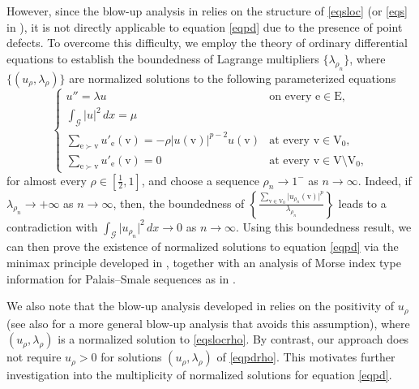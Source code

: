\documentclass[11pt]{amsart}
\newcommand{\abs}[1]{\lvert#1\rvert}
\newcommand{\G}{\mathcal{G}}
\newcommand{\E}{\mathrm{E}}
\newcommand{\V}{\mathrm{V}}
\newcommand{\e}{\mathrm{e}}
\newcommand{\vv}{\mathrm{v}}
\numberwithin{equation}{section}
\begin{document}
However, since the blow-up analysis in \cite{Bort}  relies on the structure of \eqref{eqsloc} (or \eqref{eqs} in \cite{Cha}), it is not directly applicable to equation \eqref{eqpd} due to the presence of point defects. To overcome this difficulty, we employ the theory of ordinary differential equations to establish the boundedness of Lagrange multipliers $\{\lambda_{\rho_n}\}$, where $\{(u_{\rho},\lambda_{\rho})\}$ are normalized solutions to the following parameterized equations
\begin{equation}\label{eqpdrho}
       \begin{cases} 
u'' = \lambda u & \text{on every }\e \in \E, \\ 
\int_\G\abs{u}^2\, dx = \mu & \\
\displaystyle\sum_{\e \succ \vv} u'_\e(\vv) = -\rho|u(\vv)|^{p-2}u(\vv) & \text{at every } \vv \in \V_0,\\
\displaystyle\sum_{\e \succ \vv} u'_\e(\vv) = 0 & \text{at every } \vv \in \V \setminus \V_0,
\end{cases} 
\end{equation}
for almost every $\rho \in [\frac{1}{2},1]$, and choose a sequence $\rho_n\to1^-$ as $n \to \infty$. Indeed, if $\lambda_{\rho_n} \to +\infty$ as $n \to \infty$, then, the boundedness of $\left\{\frac{\sum_{\vv \in \V_0}\abs{u_{\rho_{n}}(\vv)}^p}{\lambda_{\rho_{n}}}\right\}$ leads to a contradiction with $\int_\G\abs{u_{\rho_{n}}}^2\, dx \to 0$ as $n \to \infty$. Using this boundedness result, we can then prove the existence of normalized solutions to equation \eqref{eqpd} via the minimax principle developed in \cite{Bort0}, together with an analysis of Morse index type information for Palais--Smale sequences as in \cite{Cha,Bort}. 

We also note that the blow-up analysis developed in \cite{Bort,Cha} relies on the positivity of $u_\rho$ (see also \cite{Ca} for a more general blow-up analysis that avoids this assumption), where $(u_\rho,\lambda_\rho)$ is a normalized solution to \eqref{eqslocrho}. By contrast, our approach does not require $u_\rho>0$ for solutions $(u_\rho,\lambda_\rho)$ of \eqref{eqpdrho}. This  motivates further investigation into the multiplicity of normalized solutions for equation \eqref{eqpd}.
\end{document}
